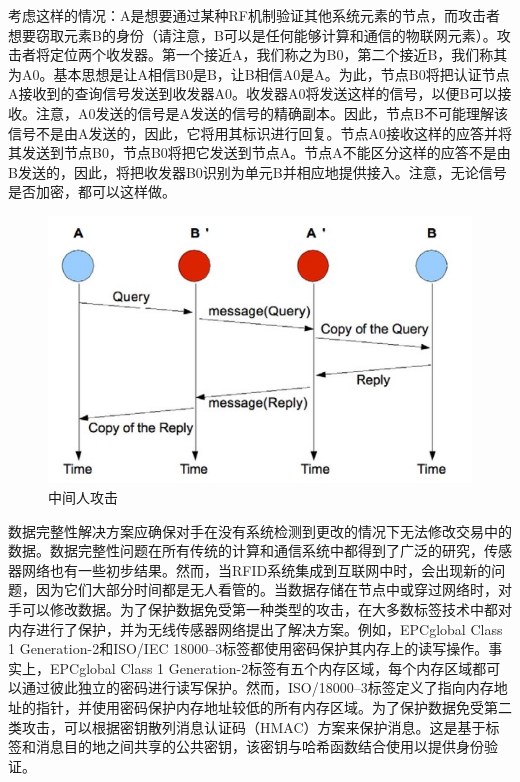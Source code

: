 \documentclass[12pt,a4paper]{article}%
\begin{document}
考虑这样的情况：A是想要通过某种RF机制验证其他系统元素的节点，而攻击者想要窃取元素B的身份（请注意，B可以是任何能够计算和通信的物联网元素）。攻击者将定位两个收发器。第一个接近A，我们称之为B0，第二个接近B，我们称其为A0。基本思想是让A相信B0是B，让B相信A0是A。为此，节点B0将把认证节点A接收到的查询信号发送到收发器A0。收发器A0将发送这样的信号，以便B可以接收。注意，A0发送的信号是A发送的信号的精确副本。因此，节点B不可能理解该信号不是由A发送的，因此，它将用其标识进行回复。节点A0接收这样的应答并将其发送到节点B0，节点B0将把它发送到节点A。节点A不能区分这样的应答不是由B发送的，因此，将把收发器B0识别为单元B并相应地提供接入。注意，无论信号是否加密，都可以这样做。

\begin{figure}[H]%
	\centering
	\begin{minipage}{0.6\textwidth}%
		\centering
		\includegraphics[width=1.0%
		\textwidth]{fig8.jpg}%
		\caption{\fontsize{10pt}{15pt}\selectfont 中间人攻击}%
	\end{minipage}
\end{figure}

数据完整性解决方案应确保对手在没有系统检测到更改的情况下无法修改交易中的数据。数据完整性问题在所有传统的计算和通信系统中都得到了广泛的研究，传感器网络也有一些初步结果。然而，当RFID系统集成到互联网中时，会出现新的问题，因为它们大部分时间都是无人看管的。当数据存储在节点中或穿过网络时，对手可以修改数据。为了保护数据免受第一种类型的攻击，在大多数标签技术中都对内存进行了保护，并为无线传感器网络提出了解决方案。例如，EPCglobal Class 1 Generation-2和ISO/IEC 18000–3标签都使用密码保护其内存上的读写操作。事实上，EPCglobal Class 1 Generation-2标签有五个内存区域，每个内存区域都可以通过彼此独立的密码进行读写保护。然而，ISO/18000–3标签定义了指向内存地址的指针，并使用密码保护内存地址较低的所有内存区域。为了保护数据免受第二类攻击，可以根据密钥散列消息认证码（HMAC）方案来保护消息。这是基于标签和消息目的地之间共享的公共密钥，该密钥与哈希函数结合使用以提供身份验证。
\end{document}
